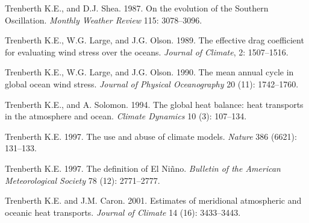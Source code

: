 \begin{thebibliography}{999}
Trenberth K.E., and D.J. Shea.  1987. On the evolution of the Southern
Oscillation. \textit{Monthly Weather Review} 115: 3078--3096.
%

Trenberth K.E., W.G. Large, and J.G. Olson.  1989. The effective drag
coefficient for evaluating wind stress over the
oceans. \textit{Journal of Climate}, 2: 1507--1516.
%

Trenberth K.E., W.G. Large, and J.G. Olson.  1990. The mean annual
cycle in global ocean wind stress. \textit{Journal of Physical
  Oceanography} 20 (11): 1742--1760.
%

Trenberth K.E., and A. Solomon.  1994. The global heat balance: heat
transports in the atmosphere and ocean. \textit{Climate Dynamics} 10
(3): 107--134.
%

Trenberth K.E.  1997. The use and abuse of climate
models. \textit{Nature} 386 (6621): 131--133.
%

Trenberth K.E.  1997. The definition of El Ni\~{n}no. \textit{Bulletin
  of the American Meteorological Society} 78 (12): 2771--2777.
%

Trenberth K.E. and J.M. Caron.  2001. Estimates of meridional
atmospheric and oceanic heat transports. \textit{Journal of Climate}
14 (16): 3433--3443.
%


\end{thebibliography}
